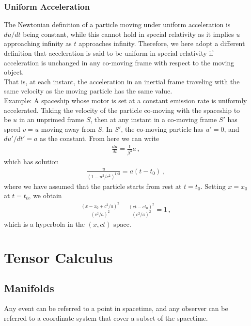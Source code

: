 \documentclass[11pt, onesided]{book}
\theoremstyle{break}
\theoremstyle{break}
\newcommand{\example}{\color{green}Example: \color{black}}
\begin{document}
\subsection{Uniform Acceleration}
The Newtonian definition of a particle moving under uniform acceleration is $du/dt$ being constant, while this cannot hold in special relativity as it implies $u$ approaching infinity as $t$ approaches infinity. Therefore, we here adopt a different definition that acceleration is said to be uniform in special relativity if acceleration is unchanged in any co-moving frame with respect to the moving object. \\

That is, at each instant, the acceleration in an inertial frame traveling with the same velocity as the moving particle has the same value. \\

\example A spaceship whose motor is set at a constant emission rate is uniformly accelerated. Taking the velocity of the particle co-moving with the spaceship to be $u$ in an unprimed frame $S$, then at any instant in a co-moving frame $S'$ has speed $v = u$ moving away from $S$.  In $S'$, the co-moving particle has $u' = 0$, and $du'/dt' = a$ as the constant. From here we can write
\begin{align*}
\frac{du}{dt} = \frac{1}{\beta^3} a\,,
\end{align*}
which has solution 
\begin{align*}
\frac{u}{(1-u^2 /c^2)^{1/2}} = a(t-t_0)\,,
\end{align*}
where we have assumed that the particle starts from rest at $t = t_0$. Setting $x = x_0$ at $t = t_0$, we obtain 
\begin{align*}
\frac{(x-x_0+c^2/a)^2}{(c^2/a)^2} - \frac{(ct-ct_0)^2}{(c^2/a)^2} = 1\,,
\end{align*}
which is a hyperbola in the $(x,ct)$-space. 

\newpage
\chapter{Tensor Calculus}
\section[Manifolds]{\color{red}Manifolds\color{black}}
Any event can be referred to a point in spacetime, and any observer can be referred to a coordinate system that cover a subset of the spacetime.\\
\end{document}
